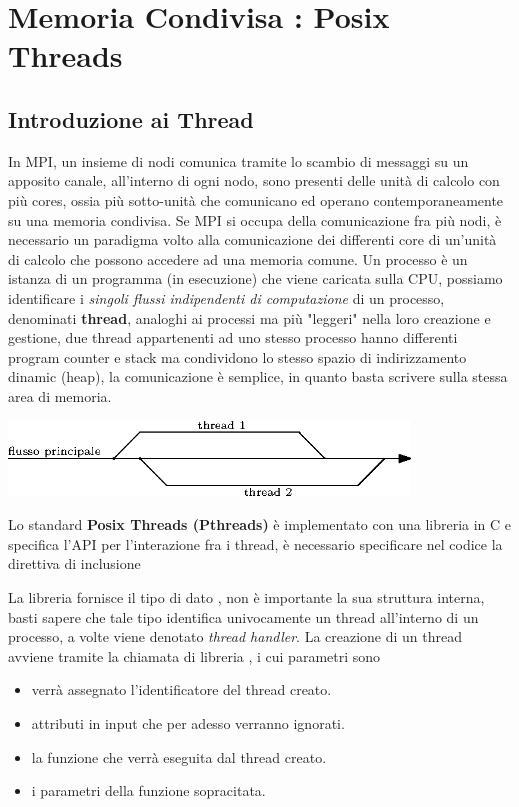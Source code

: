 \documentclass[10pt, letterpaper]{report}
\begin{document}
\chapter{Memoria Condivisa : Posix Threads}
\section{Introduzione ai Thread}
In MPI, un insieme di nodi comunica tramite lo scambio di messaggi su un apposito canale, all'interno di ogni 
nodo, sono presenti delle unità di calcolo con più cores, ossia più sotto-unità che comunicano ed operano 
contemporaneamente su una memoria condivisa.\acc 
Se MPI si occupa della comunicazione fra più nodi, è necessario un paradigma volto alla comunicazione dei differenti core 
di un'unità di calcolo che possono accedere ad una memoria comune. \acc 
Un processo è un istanza di un programma (in esecuzione) che viene caricata sulla CPU, possiamo identificare 
i \textit{singoli flussi indipendenti di computazione} di un processo, denominati \textbf{thread}, 
analoghi ai processi ma più "leggeri" nella loro creazione e gestione, due thread appartenenti ad uno 
stesso processo hanno differenti program counter e stack ma condividono lo stesso spazio di indirizzamento 
dinamic (heap), la comunicazione è semplice, in quanto basta scrivere sulla stessa area di memoria.\begin{center}
    \includegraphics[width=0.8\textwidth]{images/thread..eps}
\end{center} 
Lo standard \textbf{Posix Threads (Pthreads)} è implementato con una libreria in C e specifica l'API per 
l'interazione fra i thread, è necessario specificare nel codice la direttiva di inclusione\begin{quote}
\end{quote}
La libreria fornisce il tipo di dato , non è importante la sua struttura interna, basti 
sapere che tale tipo identifica univocamente un thread all'interno di un processo, a volte viene 
denotato \textit{thread handler}. La creazione di un thread avviene tramite la chiamata di libreria
, i cui parametri sono\begin{itemize}
    \item {} verrà assegnato l'identificatore del thread creato. 
    \item {} attributi in input che per adesso verranno ignorati. 
    \item {} la funzione che verrà eseguita dal thread creato. 
    \item {} i parametri della funzione sopracitata.
\end{itemize}
\end{document}
